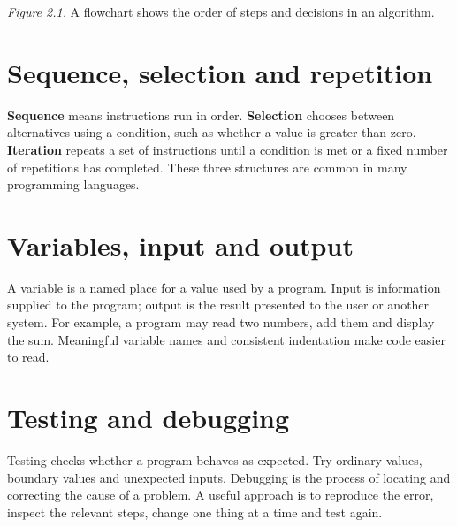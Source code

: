 \documentclass[11pt,openany,oneside]{book}
\newcommand{\keyterm}[1]{\textbf{\color{Navy}#1}}
\begin{document}
\begin{center}
\end{center}
\textit{Figure 2.1.} A flowchart shows the order of steps and decisions in an algorithm.

\section{Sequence, selection and repetition}
\keyterm{Sequence} means instructions run in order. \keyterm{Selection} chooses between alternatives using a condition, such as whether a value is greater than zero. \keyterm{Iteration} repeats a set of instructions until a condition is met or a fixed number of repetitions has completed. These three structures are common in many programming languages.

\section{Variables, input and output}
A variable is a named place for a value used by a program. Input is information supplied to the program; output is the result presented to the user or another system. For example, a program may read two numbers, add them and display the sum. Meaningful variable names and consistent indentation make code easier to read.

\section{Testing and debugging}
Testing checks whether a program behaves as expected. Try ordinary values, boundary values and unexpected inputs. Debugging is the process of locating and correcting the cause of a problem. A useful approach is to reproduce the error, inspect the relevant steps, change one thing at a time and test again.
\end{document}
